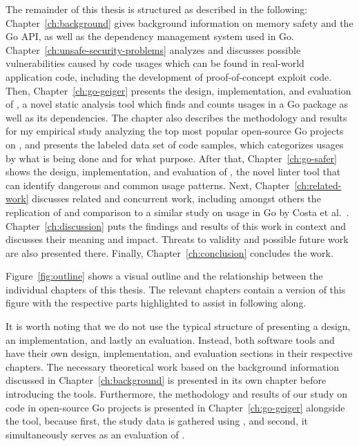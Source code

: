 The remainder of this thesis is structured as described in the following: Chapter~\ref{ch:background} gives background
information on memory safety and the Go \unsafe{} \acrshort{API}, as well as the dependency management system used in
Go.
Chapter~\ref{ch:unsafe-security-problems} analyzes and discusses possible vulnerabilities caused by \unsafe{} code
usages which can be found in real-world application code, including the development of proof-of-concept exploit code.
Then, Chapter~\ref{ch:go-geiger} presents the design, implementation, and evaluation of \toolGeiger, a novel static
analysis tool which finds and counts \unsafe{} usages in a Go package as well as its dependencies.
The chapter also describes the methodology and results for my empirical study analyzing the top \projsTotal{} most
popular open-source Go projects on \github{}, and presents the labeled data set of \numberLabeledCodeSnippets{} code
samples, which categorizes \unsafe{} usages by what is being done and for what purpose.
After that, Chapter~\ref{ch:go-safer} shows the design, implementation, and evaluation of \toolSafer, the novel linter
tool that can identify  dangerous and common \unsafe{} usage patterns.
Next, Chapter~\ref{ch:related-work} discusses related and concurrent work, including amongst others the replication of
and comparison to a similar study on \unsafe{} usage in Go by Costa et al.~\cite{costa2020}.
Chapter~\ref{ch:discussion} puts the findings and results of this work in context and discusses their meaning and
impact.
Threats to validity and possible future work are also presented there.
Finally, Chapter~\ref{ch:conclusion} concludes the work.

Figure~\ref{fig:outline} shows a visual outline and the relationship between the individual chapters of this thesis.
The relevant chapters contain a version of this figure with the respective parts highlighted to assist in following
along.



It is worth noting that we do not use the typical structure of presenting a design, an implementation, and lastly an
evaluation.
Instead, both software tools \toolGeiger{} and \toolSafer{} have their own design, implementation, and evaluation
sections in their respective chapters.
The necessary theoretical work based on the background information discussed in Chapter~\ref{ch:background} is presented
in its own chapter before introducing the tools.
Furthermore, the methodology and results of our study on \unsafe{} code in open-source Go projects is presented in
Chapter~\ref{ch:go-geiger} alongside the \toolGeiger{} tool, because first, the study data is gathered using \toolGeiger,
and second, it simultaneously serves as an evaluation of \toolGeiger{}.
